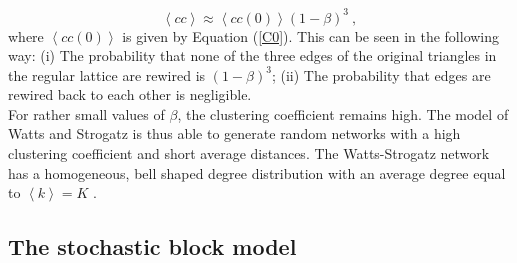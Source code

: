 \documentclass[11 pt , letterpaper , twoside , openright]{book}
\begin{document}
\begin{equation}
	\left<cc\right> \approx \left<cc(0)\right>(1-\beta)^3 \ ,
\end{equation} 
where $\left<cc(0)\right>$ is given by Equation (\ref{C0}). This can be seen in the following way: (i) The probability that none of the three edges of the original triangles in the regular lattice are rewired is $(1-\beta)^3$; (ii) The probability that edges are rewired back to each other is negligible.\\
\newline
For rather small values of $\beta$, the clustering coefficient remains high. The model of Watts and Strogatz is thus able to generate random networks with a high clustering coefficient and short average distances. The Watts-Strogatz network has a homogeneous, bell shaped degree distribution with an average degree equal to $\left<k\right> = K$ \cite{Barrat1999}.

\subsection{The stochastic block model}
\end{document}
